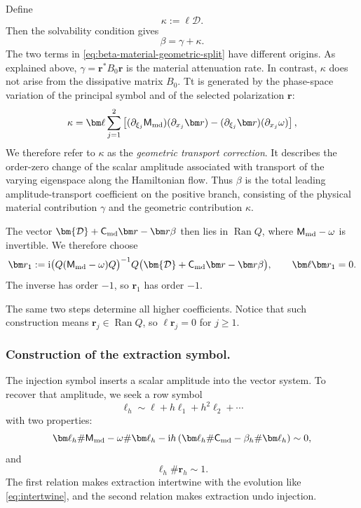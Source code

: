 \documentclass[11pt,reqno]{amsart}
\newcommand{\ii}{\mathrm{i}}
\numberwithin{equation}{section}
\begin{document}
Define
\begin{equation*}
    \kappa:=\bm\ell\bm{\mathcal D}.
\end{equation*}
Then the solvability condition gives
\begin{equation}\label{eq:beta-material-geometric-split}
    \beta=\gamma+\kappa.
\end{equation}
The two terms in \eqref{eq:beta-material-geometric-split} have different origins. As explained above, $\gamma=\bm r^*B_0\bm r$ is the material attenuation rate. In contrast, $\kappa$ does not arise from the dissipative matrix $B_0$. Tt is generated by the phase-space variation of the principal symbol and of the selected polarization $\bm r$:
$$
    \kappa=\bm\ell\sum_{j=1}^2\left[(\partial_{\xi_j}\mathsf M_{\rm md})(\partial_{x_j}\bm r)-(\partial_{\xi_j}\bm r)(\partial_{x_j}\omega)\right],
$$
We therefore refer to $\kappa$ as the \emph{geometric transport correction}. It describes the order-zero change of the scalar amplitude associated with transport of the varying eigenspace along the Hamiltonian flow. Thus $\beta$ is the total leading amplitude-transport coefficient on the positive branch, consisting of the physical material contribution $\gamma$ and the geometric contribution $\kappa$.

The vector $\bm{\mathcal D}+\mathsf C_{\rm md}\bm r-\bm r\beta$ then lies in $\operatorname{Ran}Q$, where $\mathsf M_{\rm md}-\omega$ is invertible. We therefore choose
\begin{equation*}
    \bm r_1:=\ii\bigl(Q(\mathsf M_{\rm md}-\omega)Q\bigr)^{-1}Q\bigl(\bm{\mathcal D}+\mathsf C_{\rm md}\bm r-\bm r\beta\bigr),  \qquad\bm\ell\bm r_1=0.
\end{equation*}
The inverse has order $-1$, so $\bm r_1$ has order $-1$.

The same two steps determine all higher coefficients. Notice that such construction means $\bm{r}_j\in\operatorname{Ran} Q$, so $\bm\ell\bm r_j=0$ for $j\ge1$.

\subsubsection{Construction of the extraction symbol.}\label{sec:extraction-symbol}
The injection symbol inserts a scalar amplitude into the vector system. To recover that amplitude, we seek a row symbol
\begin{equation*}
    \bm\ell_h\sim\bm\ell+h\bm\ell_1+h^2\bm\ell_2+\cdots
\end{equation*}
with two properties:
\begin{equation}\label{eq:left-symbolic-intertwining}
    \bm\ell_h\#\mathsf M_{\rm md}-\omega\#\bm\ell_h-\ii h\left(\bm\ell_h\#\mathsf C_{\rm md}-\beta_h\#\bm\ell_h\right)\sim0,
\end{equation}
and
\begin{equation}\label{eq:symbolic-normalization}
    \bm\ell_h\#\bm r_h\sim1.
\end{equation}
The first relation makes extraction intertwine with the evolution like \eqref{eq:intertwine}, and the second relation makes extraction undo injection.
\end{document}
